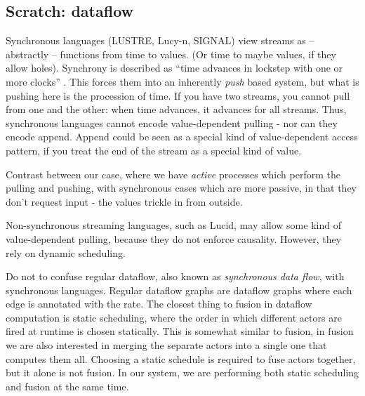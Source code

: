 \subsection{Scratch: dataflow}
Synchronous languages (LUSTRE, Lucy-n, SIGNAL) view streams as -- abstractly -- functions from time to values.
(Or time to maybe values, if they allow holes).
Synchrony is described as ``time advances in lockstep with one or more clocks'' \cite{benveniste2003synchronous}.
This forces them into an inherently \emph{push} based system, but what is pushing here is the procession of time.
If you have two streams, you cannot pull from one and the other: when time advances, it advances for all streams.
Thus, synchronous languages cannot encode value-dependent pulling - nor can they encode append.
Append could be seen as a special kind of value-dependent access pattern, if you treat the end of the stream as a special kind of value.

Contrast between our case, where we have \emph{active} processes which perform the pulling and pushing, with synchronous cases which are more passive, in that they don't request input - the values trickle in from outside.


Non-synchronous streaming languages, such as Lucid, may allow some kind of value-dependent pulling, because they do not enforce causality.
However, they rely on dynamic scheduling.

Do not to confuse regular dataflow, also known as \emph{synchronous data flow}, with synchronous languages.
Regular dataflow graphs are dataflow graphs where each edge is annotated with the rate.
The closest thing to fusion in dataflow computation is static scheduling, where the order in which different actors are fired at runtime is chosen statically.
This is somewhat similar to fusion, in fusion we are also interested in merging the separate actors into a single one that computes them all.
Choosing a static schedule is required to fuse actors together, but it alone is not fusion.
In our system, we are performing both static scheduling and fusion at the same time.

